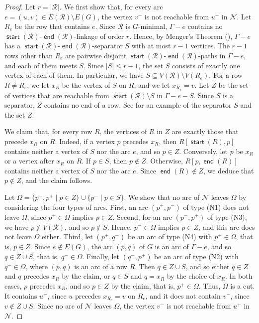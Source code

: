 \documentclass[fontsize=12pt,leading=14pt]{fullpaper}
\DeclareMathOperator{\st}{\mathsf{start}}
\DeclareMathOperator{\en}{\mathsf{end}}
\newcommand{\Ncal}{\mathcal{N}}
\newcommand{\Rcal}{\mathcal{R}}
\begin{document}
\begin{proof}
  Let $r=|\Rcal|$.
  We first show that, for every arc $e=(u,v)\in E(\Rcal)\setminus E(G)$, the vertex $v^-$ is not reachable from $u^+$ in $\Ncal$.
  Let $R_e$ be the row that contains $e$.
  Since $\Rcal$ is $G$-minimal, $\Gamma-e$ contains no $\st(\Rcal)$-$\en(\Rcal)$-linkage of order $r$.
  Hence, by Menger's Theorem (), $\Gamma-e$ has a $\st(\Rcal)$-$\en(\Rcal)$-separator $S$ with at most $r-1$ vertices.
  The $r-1$ rows other than $R_e$ are pairwise disjoint $\st(\Rcal)$-$\en(\Rcal)$-paths in $\Gamma-e$, and each of them meets $S$.
  Since $|S|\le r-1$, the set $S$ consists of exactly one vertex of each of them.
  In particular, we have $S\subseteq V(\Rcal)\setminus V(R_e)$.
  For a row $R\ne R_e$, we let $x_R$ be the vertex of $S$ on $R$, and we let $x_{R_e}=v$.
  Let $Z$ be the set of vertices that are reachable from $\st(\Rcal)\setminus S$ in $\Gamma-e-S$.
  Since $S$ is a separator, $Z$ contains no end of a row.
  See  for an example of the separator $S$ and the set $Z$.

  We claim that, for every row $R$, the vertices of $R$ in $Z$ are exactly those that precede $x_R$ on $R$.
  Indeed, if a vertex $p$ precedes $x_R$, then $R[\st(R),p]$ contains neither a vertex of $S$ nor the arc $e$, and so $p\in Z$.
  Conversely, let $p$ be $x_R$ or a vertex after $x_R$ on $R$.
  If $p\in S$, then $p\notin Z$.
  Otherwise, $R[p,\en(R)]$ contains neither a vertex of $S$ nor the arc $e$.
  Since $\en(R)\notin Z$, we deduce that $p\notin Z$, and the claim follows.

  Let $\Omega=\{p^-,p^+\mid p\in Z\}\cup\{p^-\mid p\in S\}$.
  We show that no arc of $\Ncal$ leaves $\Omega$ by considering the four types of arcs.
  First, an arc $(p^+,p^-)$ of type (N1) does not leave $\Omega$, since $p^+\in\Omega$ implies $p\in Z$.
  Second, for an arc $(p^-,p^+)$ of type (N3), we have $p\notin V(\Rcal)$, and so $p\notin S$.
  Hence, $p^-\in\Omega$ implies $p\in Z$, and this arc does not leave $\Omega$ either.
  Third, let $(p^+,q^-)$ be an arc of type (N4) with $p^+\in\Omega$, that is, $p\in Z$.
  Since $e\notin E(G)$, the arc $(p,q)$ of $G$ is an arc of $\Gamma-e$, and so $q\in Z\cup S$, that is, $q^-\in\Omega$.
  Finally, let $(q^-,p^+)$ be an arc of type (N2) with $q^-\in\Omega$, where $(p,q)$ is an arc of a row $R$.
  Then $q\in Z\cup S$, and so either $q\in Z$ and $q$ precedes $x_R$ by the claim, or $q\in S$ and $q=x_R$ by the choice of $x_R$.
  In both cases, $p$ precedes $x_R$, and so $p\in Z$ by the claim, that is, $p^+\in\Omega$.
  Thus, $\Omega$ is a cut.
  It contains $u^+$, since $u$ precedes $x_{R_e}=v$ on $R_e$, and it does not contain $v^-$, since $v\notin Z\cup S$.
  Since no arc of $\Ncal$ leaves $\Omega$, the vertex $v^-$ is not reachable from $u^+$ in $\Ncal$.


\end{proof}
\end{document}
